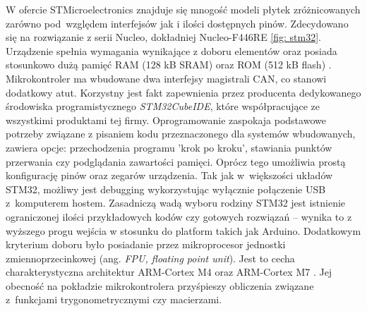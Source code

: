W ofercie STMicroelectronics znajduje się mnogość modeli płytek zróżnicowanych zarówno pod~względem interfejsów jak i ilości dostępnych pinów. Zdecydowano się na rozwiązanie z serii Nucleo, dokładniej Nucleo-F446RE \ref{fig: stm32}. Urządzenie spełnia wymagania wynikające z doboru elementów oraz posiada stosunkowo dużą pamięć RAM (128 kB SRAM) oraz ROM (512 kB flash) \cite{ds1093}. Mikrokontroler ma wbudowane dwa interfejsy magistrali CAN, co stanowi dodatkowy atut. Korzystny jest fakt zapewnienia przez producenta dedykowanego środowiska programistycznego \textit{STM32CubeIDE}, które współpracujące ze wszystkimi produktami tej firmy. Oprogramowanie zaspokaja podstawowe potrzeby związane z pisaniem kodu przeznaczonego dla systemów wbudowanych, zawiera opcje: przechodzenia programu 'krok po kroku', stawiania punktów przerwania czy podglądania zawartości pamięci. Oprócz tego umożliwia prostą konfigurację pinów oraz zegarów urządzenia. Tak jak w~większości układów STM32, możliwy jest debugging wykorzystując wyłącznie połączenie USB z~komputerem hostem. Zasadniczą wadą wyboru rodziny STM32 jest istnienie ograniczonej ilości przykładowych kodów czy gotowych rozwiązań -- wynika to z wyższego progu wejścia w stosunku do platform takich jak Arduino. Dodatkowym kryterium doboru było posiadanie przez mikroprocesor jednostki zmiennoprzecinkowej (ang. \textit{FPU, floating point unit}). Jest to cecha charakterystyczna architektur ARM-Cortex M4 oraz ARM-Cortex M7 \cite{cortexm4}. Jej obecność na pokładzie mikrokontrolera przyśpieszy obliczenia związane z~funkcjami trygonometrycznymi czy macierzami. 